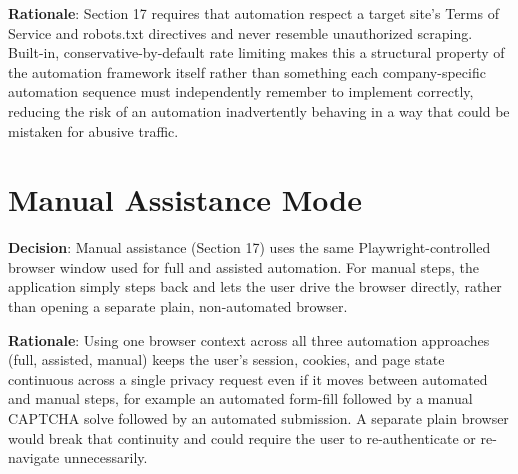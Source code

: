 \textbf{Rationale}: Section 17 requires that automation respect a target site's Terms of Service and robots.txt directives and never resemble unauthorized scraping. Built-in, conservative-by-default rate limiting makes this a structural property of the automation framework itself rather than something each company-specific automation sequence must independently remember to implement correctly, reducing the risk of an automation inadvertently behaving in a way that could be mistaken for abusive traffic.
\section{Manual Assistance Mode}
\textbf{Decision}: Manual assistance (Section 17) uses the same Playwright-controlled browser window used for full and assisted automation. For manual steps, the application simply steps back and lets the user drive the browser directly, 
rather than opening a separate plain, non-automated browser.

\textbf{Rationale}: Using one browser context across all three automation approaches (full, assisted, manual) keeps the user's session, cookies, and page state continuous across a single privacy request even if it moves between automated and manual steps, for example an automated form-fill followed by a manual CAPTCHA solve followed by an automated submission. A separate plain browser would break that continuity and could require the user to re-authenticate or re-navigate unnecessarily.


\sentinelchapterend